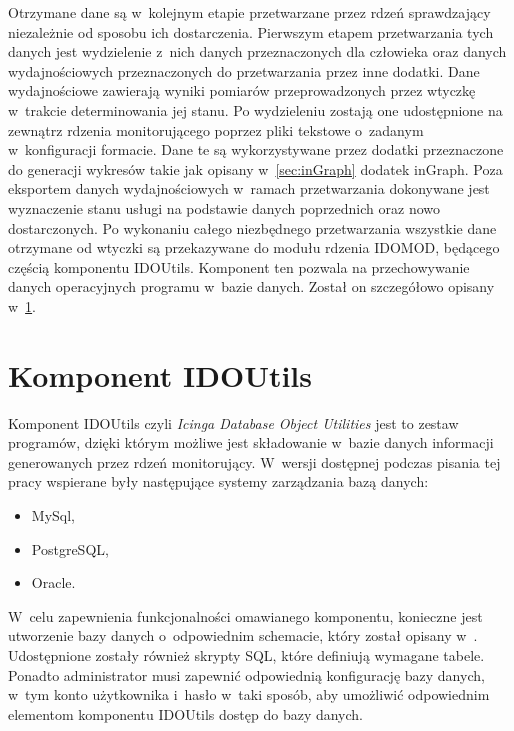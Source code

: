 Otrzymane dane są w~kolejnym etapie przetwarzane przez rdzeń
sprawdzający niezależnie od sposobu ich dostarczenia. Pierwszym etapem
przetwarzania tych danych jest wydzielenie z~nich danych
przeznaczonych dla człowieka oraz danych wydajnościowych
przeznaczonych do przetwarzania przez inne dodatki. Dane wydajnościowe
zawierają wyniki pomiarów przeprowadzonych przez wtyczkę w~trakcie
determinowania jej stanu. Po wydzieleniu zostają one udostępnione na
zewnątrz rdzenia monitorującego poprzez pliki tekstowe o~zadanym
w~konfiguracji formacie. Dane te są wykorzystywane przez dodatki
przeznaczone do generacji wykresów takie jak opisany
w~\ref{sec:inGraph} dodatek inGraph. Poza eksportem danych
wydajnościowych w~ramach przetwarzania dokonywane jest wyznaczenie
stanu usługi na podstawie danych poprzednich oraz nowo
dostarczonych. Po wykonaniu całego niezbędnego przetwarzania wszystkie
dane otrzymane od wtyczki są przekazywane do modułu rdzenia IDOMOD,
będącego częścią komponentu IDOUtils. Komponent ten pozwala na
przechowywanie danych operacyjnych programu w~bazie danych. Został on
szczegółowo opisany w~\ref{sec:IDOUtils}.

\section[Komponent IDOUtils][Komponent IDOUtils]{Komponent IDOUtils}
\label{sec:IDOUtils}

Komponent IDOUtils czyli {\em Icinga Database Object Utilities} jest
to zestaw programów, dzięki którym możliwe jest składowanie w~bazie
danych informacji generowanych przez rdzeń monitorujący. W~wersji
dostępnej podczas pisania tej pracy wspierane były następujące systemy
zarządzania bazą danych:

\begin{itemize}
\item MySql,
\item PostgreSQL,
\item Oracle.
\end{itemize}

W~celu zapewnienia funkcjonalności omawianego komponentu, konieczne
jest utworzenie bazy danych o~odpowiednim schemacie, który został
opisany w~\cite[669-750]{www:IcingaDoc}. Udostępnione zostały również
skrypty SQL, które definiują wymagane tabele. Ponadto administrator
musi zapewnić odpowiednią konfigurację bazy danych, w~tym konto
użytkownika i~hasło w~taki sposób, aby umożliwić odpowiednim
elementom komponentu IDOUtils dostęp do bazy danych.

